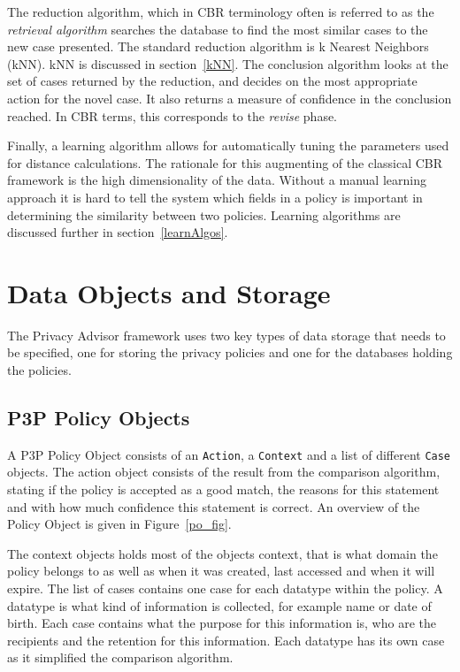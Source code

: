 The reduction algorithm, which in CBR terminology often is referred to as the \emph{retrieval algorithm} searches the database to find the most similar cases to the new case presented. The standard reduction algorithm is k Nearest Neighbors (kNN). kNN is discussed in section~\ref{kNN}. The conclusion algorithm looks at the set of cases returned by the reduction, and decides on the most appropriate action for the novel case. It also returns a measure of confidence in the conclusion reached. In CBR terms, this corresponds to the \emph{revise} phase.

Finally, a learning algorithm allows for automatically tuning the parameters used for distance calculations. The rationale for this augmenting of the classical CBR framework is the high dimensionality of the data. Without a manual learning approach it is hard to tell the system which fields in a policy is important in determining the similarity between two policies. Learning algorithms are discussed further in section~\ref{learnAlgos}.


\section{Data Objects and Storage}

The Privacy Advisor framework uses two key types of data storage that needs to be specified, one for storing the privacy policies and one for the databases holding the policies.

\subsection{P3P Policy Objects}\label{p3pPolObj}
A P3P Policy Object consists of an \texttt{Action}, a \texttt{Context} and a list of different \texttt{Case} objects. The action object consists of the result from the comparison algorithm, stating if the policy is accepted as a good match, the reasons for this statement and with how much confidence this statement is correct. An overview of the Policy Object is given in Figure~\ref{po_fig}.

The context objects holds most of the objects context, that is what domain the policy belongs to as well as when it was created, last accessed and when it will expire. The list of cases contains one case for each datatype within the policy. A datatype is what kind of information is collected, for example name or date of birth. Each case contains what the purpose for this information is, who are the recipients and the retention for this information. Each datatype has its own case as it simplified the comparison algorithm.

